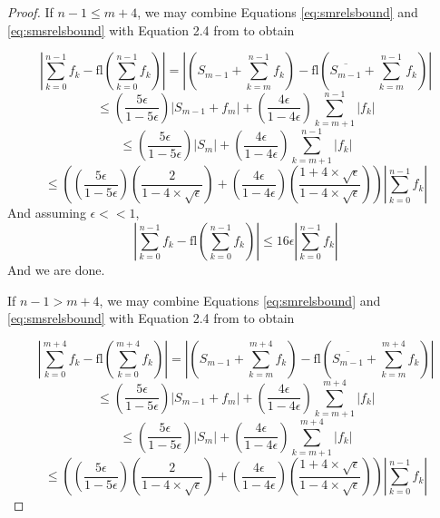 \documentclass[12pt]{article}
\providecommand{\fl}{\ensuremath{\text{fl}}}
\theoremstyle{plain}
\numberwithin{equation}{section}
\begin{document}
\begin{proof}
      If $n - 1 \leq m + 4$, we may combine Equations \ref{eq:smrelsbound} and \ref{eq:smsrelsbound} with Equation 2.4 from \cite{higham} to obtain

      \begin{equation*}
        |\sum \limits_{k = 0}^{n - 1} f_k - \fl(\sum \limits_{k = 0}^{n - 1} f_k)| = |(S_{m - 1} + \sum \limits_{k = m}^{n - 1} f_k) - \fl(\overline{S_{m - 1}} + \sum \limits_{k = m}^{n - 1} f_k)|
      \end{equation*}
      \begin{equation*}
        \leq (\frac{5\epsilon}{1 - 5 \epsilon})|S_{m - 1} + f_m| + (\frac{4\epsilon}{1 - 4 \epsilon})\sum\limits_{k = m + 1}^{n - 1}|f_k|
      \end{equation*}
      \begin{equation*}
        \leq (\frac{5\epsilon}{1 - 5 \epsilon})|S_m| + (\frac{4\epsilon}{1 - 4 \epsilon})\sum\limits_{k = m + 1}^{n - 1}|f_k|
      \end{equation*}
      \begin{equation*}
 \leq ((\frac{5\epsilon}{1 - 5 \epsilon})(\frac{2}{1 - 4 \times \sqrt\epsilon}) + (\frac{4\epsilon}{1 - 4 \epsilon})(\frac{1 + 4 \times \sqrt\epsilon}{1 - 4 \times \sqrt\epsilon}))|\sum\limits_{k = 0}^{n - 1}f_k|
      \end{equation*}
      And assuming $\epsilon << 1$,
      \begin{equation*}
        |\sum \limits_{k = 0}^{n - 1} f_k - \fl(\sum \limits_{k = 0}^{n - 1} f_k)| \leq 16\epsilon|\sum\limits_{k = 0}^{n - 1}f_k|
      \end{equation*}
      And we are done.

      If $n - 1 > m + 4$, we may combine Equations \ref{eq:smrelsbound} and \ref{eq:smsrelsbound} with Equation 2.4 from \cite{higham} to obtain

      \begin{equation*}
        |\sum \limits_{k = 0}^{m + 4} f_k - \fl(\sum \limits_{k = 0}^{m + 4} f_k)| = |(S_{m - 1} + \sum \limits_{k = m}^{m + 4} f_k) - \fl(\overline{S_{m - 1}} + \sum \limits_{k = m}^{m + 4} f_k)|
      \end{equation*}
      \begin{equation*}
        \leq (\frac{5\epsilon}{1 - 5 \epsilon})|S_{m - 1} + f_m| + (\frac{4\epsilon}{1 - 4 \epsilon})\sum\limits_{k = m + 1}^{m + 4}|f_k|
      \end{equation*}
      \begin{equation*}
        \leq (\frac{5\epsilon}{1 - 5 \epsilon})|S_m| + (\frac{4\epsilon}{1 - 4 \epsilon})\sum\limits_{k = m + 1}^{m + 4}|f_k|
      \end{equation*}
      \begin{equation}
 \leq ((\frac{5\epsilon}{1 - 5 \epsilon})(\frac{2}{1 - 4 \times \sqrt\epsilon}) + (\frac{4\epsilon}{1 - 4 \epsilon})(\frac{1 + 4 \times \sqrt\epsilon}{1 - 4 \times \sqrt\epsilon}))|\sum\limits_{k = 0}^{n - 1}f_k|
        \label{eq:smfiveerror}
      \end{equation}


\end{proof}
\end{document}
